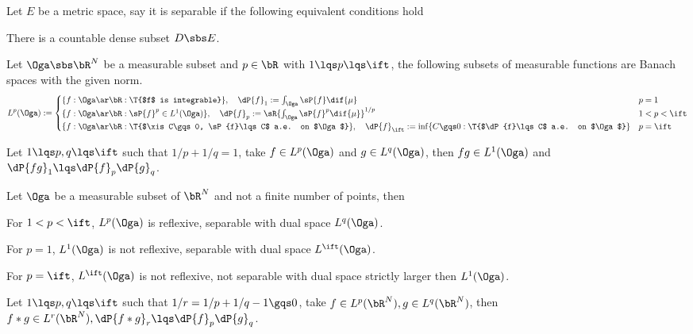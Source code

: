 \documentclass[article, a4paper, twoside]{universal}
\begin{document}
\begin{dfn}
    Let $E$ be a metric space, say it is separable if the following equivalent conditions hold
    \begin{enr}[label=(\arabic*)]
        \item There is a countable dense subset $D\sbs E$.
    \end{enr}
\end{dfn}


\begin{dfn}
    Let $\Oga\sbs\bR^{N}$ be a measurable subset and $p\in\bR$ with $1\lqs p\lqs\ift$, the following subsets of measurable functions are Banach spaces with the given norm.
    \[
        L^{p}(\Oga):=\begin{cases}
          \{f:\Oga\ar\bR: \T{$f$ is integrable}\},\quad \dP{f}_{1}:=\int_{\Oga}\sP{f}\dif{\mu} & p=1 \\
          \{f:\Oga\ar\bR: \sP{f}^{p}\in L^{1}(\Oga)\},\quad \dP{f}_{p}:=\sR{\int_{\Oga}\sP{f}^{p}\dif{\mu}}^{1/p} & 1<p<\ift \\
          \{f:\Oga\ar\bR:\T{$\xis C\gqs0, \sP{f}\lqs C$ a.e. on $\Oga$}\},\quad \dP{f}_{\ift}:=\inf\{C\gqs0:\T{$\dP{f}\lqs C$ a.e. on $\Oga$}\}& p=\ift
        \end{cases}
    \]
\end{dfn}

\begin{thm}
    Let $1\lqs p,q\lqs\ift$ such that $1/p+1/q=1$, take $f\in L^{p}(\Oga)$ and $g\in L^{q}(\Oga)$, then $fg\in L^{1}(\Oga)$ and $\dP{fg}_{1}\lqs\dP{f}_{p}\dP{g}_{q}$.
\end{thm}


\begin{thm}
    Let $\Oga$ be a measurable subset of $\bR^{N}$ and not a finite number of points, then
    \begin{enr}[label=(\arabic*)]
        \item For $1<p<\ift$, $L^{p}(\Oga)$ is reflexive, separable with dual space $L^{q}(\Oga)$.
        \item For $p=1$, $L^{1}(\Oga)$ is not reflexive, separable with dual space $L^{\ift}(\Oga)$.
        \item For $p=\ift$, $L^{\ift}(\Oga)$ is not reflexive, not separable with dual space strictly larger then $L^{1}(\Oga)$.
    \end{enr}
\end{thm}


\begin{thm}
    Let $1\lqs p,q\lqs\ift$ such that $1/r=1/p+1/q-1\gqs0$, take $f\in L^{p}(\bR^{N}),g\in L^{q}(\bR^{N})$, then $f\ast g\in L^{r}(\bR^{N}),\dP{f\ast g}_{r}\lqs \dP{f}_{p}\dP{g}_{q}$.
\end{thm}
\end{document}
